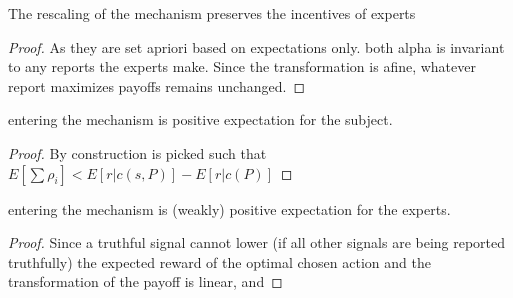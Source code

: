 \begin{lem}
	The rescaling of the mechanism preserves the incentives of experts
\end{lem}

\begin{proof}
	As they are set apriori based on expectations only. both alpha is invariant to any reports the experts make. Since the transformation is afine, whatever report maximizes payoffs remains unchanged.
\end{proof}


\begin{lem}
	entering the mechanism is positive expectation for the subject.
\end{lem}

\begin{proof}
  By construction \alpha is picked such that $E[\sum \rho_i] < E[r|c(s,P)] - E[r|c(P)] $
\end{proof}


\begin{lem}
	entering the mechanism is (weakly) positive expectation for the experts.
\end{lem}

\begin{proof}
Since a truthful signal cannot lower (if all other signals are being reported truthfully) the expected reward of the optimal chosen action and the transformation of the payoff is linear, and 
\end{proof}


